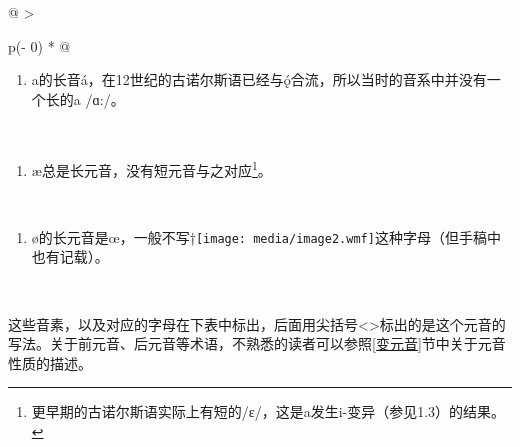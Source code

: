 \begin{longtable}[]{@{}
  >{\raggedright\arraybackslash}p{(\columnwidth - 0\tabcolsep) * }@{}}
  \toprule\noalign{}
  \begin{minipage}[b]{\linewidth}\raggedright
    \begin{enumerate}
      \def\labelenumi{\arabic{enumi}.}
      \item
            a的长音á，在12世纪的古诺尔斯语已经与ǫ́合流，所以当时的音系中并没有一个长的a
            /ɑ:/。
    \end{enumerate}
  \end{minipage} \\
  \midrule\noalign{}
  \endhead
  \bottomrule\noalign{}
  \endlastfoot
  \begin{minipage}[t]{\linewidth}\raggedright
    \begin{enumerate}
      \def\labelenumi{\arabic{enumi}.}
      \setcounter{enumi}{1}
      \item
            æ总是长元音，没有短元音与之对应\footnote{更早期的古诺尔斯语实际上有短的/ɛ/，这是a发生i-变异（参见1.3）的结果。}。
    \end{enumerate}
  \end{minipage} \\
  \begin{minipage}[t]{\linewidth}\raggedright
    \begin{enumerate}
      \def\labelenumi{\arabic{enumi}.}
      \setcounter{enumi}{2}
      \item
            ø的长元音是œ，一般不写†\texttt{[image: media/image2.wmf]}这种字母（但手稿中也有记载）。
    \end{enumerate}
  \end{minipage} \\
\end{longtable}

这些音素，以及对应的字母在下表中标出，后面用尖括号\textless\textgreater 标出的是这个元音的写法。关于前元音、后元音等术语，不熟悉的读者可以参照\ref{变元音}节中关于元音性质的描述。

